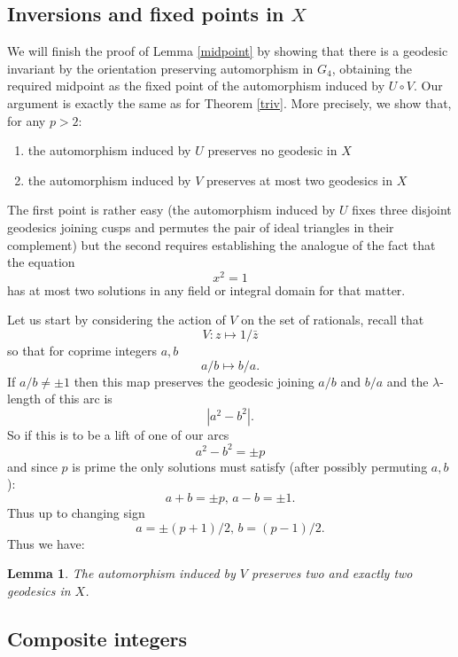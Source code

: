 \documentclass[12pt,a4paper]{amsart}
\newtheorem{lem}[thm]{Lemma}
\def\KK{G_4}
\def\ggp{X}
\begin{document}
\subsection{Inversions and fixed points in $X$}

We will finish the proof of  Lemma \ref{midpoint}
by showing that there is a geodesic invariant by 
the orientation preserving automorphism in $\KK$,
obtaining the required midpoint as the fixed point of the automorphism induced by $U\circ V$.
Our  argument is exactly  the same as for
 Theorem \ref{triv}.
 More precisely, we show that, for any  $p > 2$:
\begin{enumerate}
\item the automorphism induced by $U$ preserves no geodesic in  $\ggp$
\item the automorphism induced by $V$ preserves at most two geodesics in $\ggp$
\end{enumerate}

The first point is rather easy 
(the automorphism induced by $U$ fixes three disjoint geodesics joining 
cusps and permutes the pair of ideal triangles in their complement)
 but the second requires establishing
 the analogue of the fact that  the equation
$$x^2 = 1$$
has at most two solutions in any field or integral domain for that matter. 

Let us start by 
considering the action of $V$
on the set of rationals, recall that
$$V: z \mapsto 1/\bar{z}$$
so that for coprime integers $a,b$
$$a/b \mapsto b/a.$$
If $a/b \neq \pm 1$ 
then this map preserves the
geodesic joining $a/b$ and $b/a$
and the $\lambda$-length of this arc is
$$|a^2 - b^2|.$$
So if this is to be a lift of one of our arcs
$$ a^2 - b^2 = \pm p$$
and since $p$ is prime the only solutions
must satisfy (after possibly permuting $a,b$):
$$a + b = \pm p,\, a - b = \pm 1.$$
Thus up to changing sign
$$a = \pm(p + 1)/2,\,  b = (p-1)/2.$$
Thus we have:

\begin{lem}\label{just two}
The automorphism induced by $V$ preserves two and exactly two geodesics in $\ggp$.
\end{lem}


\subsection{Composite integers}
\end{document}
